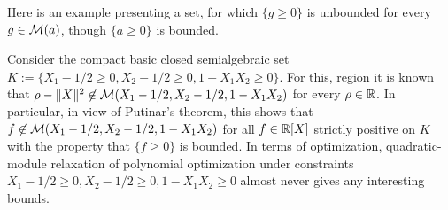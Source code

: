 Here is an example presenting a set, for which $\{g \ge 0\}$ is unbounded for every $g \in \mathcal{M}(a)$, though $\{a \ge 0\}$ is bounded. 

\begin{example}
	Consider the compact basic closed semialgebraic set $K:=\{X_1 - 1/2 \ge 0, X_2 - 1/2 \ge 0, 1 - X_1 X_2 \ge 0\}$. 
	For this, region it is known that $\rho - \|X\|^2 \not\in \mathcal{M}(X_1 - 1/2,X_2-1/2,1 - X_1X_2)$ for every $\rho \in \mathbb{R}$. In particular, in view of Putinar's theorem, this shows that $f \not\in \mathcal{M}(X_1 - 1/2,X_2 - 1/2,1 - X_1X_2)$ for all $f \in \mathbb{R}[X]$ strictly positive on $K$ with the property that $\{f \ge 0\}$ is bounded. In terms of optimization, quadratic-module relaxation of polynomial optimization under constraints $X_1 - 1/2 \ge 0, X_2 - 1/2 \ge 0, 1 -X_1 X_2 \ge 0$ almost never gives any interesting bounds. 
\end{example}
